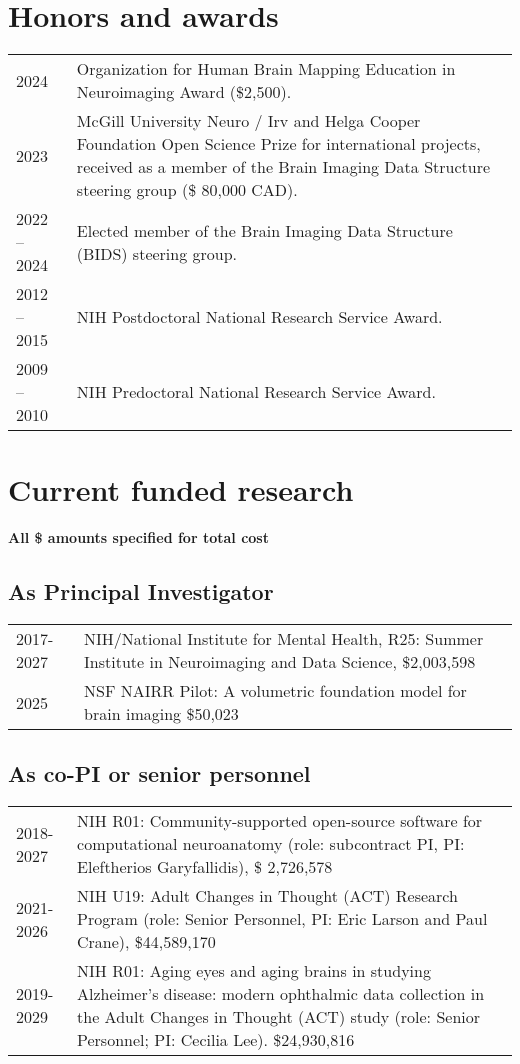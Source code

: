 \documentclass[11pt,fullpage]{article}
\begin{document}
\section*{Honors and awards}
\begin{tabular}{p{}p{}}

2024 & Organization for Human Brain Mapping Education in Neuroimaging Award (\$2,500).\\
2023 &  McGill University Neuro / Irv and Helga Cooper Foundation Open Science Prize for international projects, received as a member of the Brain Imaging Data Structure steering group (\$ 80,000 CAD).\\
2022 -- 2024 & Elected member of the Brain Imaging Data Structure (BIDS) steering group. \\
2012 -- 2015 & NIH Postdoctoral National Research Service Award. \\
2009 -- 2010 & NIH Predoctoral National Research Service Award. \\
\end{tabular}

\section*{Current funded research}

\textbf{All \$ amounts specified for total cost}

\subsection*{As Principal Investigator}
\begin{tabular}{p{}p{}}
2017-2027 & NIH/National Institute for Mental Health, R25: Summer Institute in Neuroimaging and Data Science, \$2,003,598\\
2025 & NSF NAIRR Pilot: A volumetric foundation model for brain imaging \$50,023 \\
\end{tabular}

\subsection*{As co-PI or senior personnel}
\begin{tabular}{p{}p{}}
2018-2027 & NIH R01: Community-supported open-source software for computational neuroanatomy (role: subcontract PI, PI: Eleftherios Garyfallidis), \$ 2,726,578 \\
2021-2026 & NIH U19: Adult Changes in Thought (ACT) Research Program (role: Senior Personnel, PI: Eric Larson and Paul Crane), \$44,589,170\\
2019-2029 & NIH R01: Aging eyes and aging brains in studying Alzheimer's disease: modern ophthalmic data collection in the Adult Changes in Thought (ACT) study (role: Senior Personnel; PI: Cecilia Lee). \$24,930,816  \\
\end{tabular}
\end{document}
